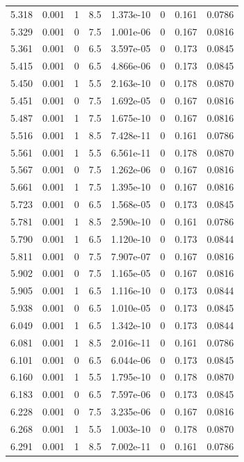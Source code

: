 \documentclass[preview]{standalone}
\begin{document}
{{{{\begin{tabular}{L{1.2cm}C{1.2cm} C{0.3cm}C{0.5cm} C{1.4cm}C{1.4cm} C{1.4cm}C{1.4cm}}
  5.318  &  0.001  & 1     & 8.5 &  1.373e-10  & 0  & 0.161 &  0.0786   \\ 
  5.329  &  0.001  & 0     & 7.5 &  1.001e-06  & 0  & 0.167 &  0.0816   \\ 
  5.361  &  0.001  & 0     & 6.5 &  3.597e-05  & 0  & 0.173 &  0.0845   \\ 
  5.415  &  0.001  & 0     & 6.5 &  4.866e-06  & 0  & 0.173 &  0.0845   \\ 
  5.450  &  0.001  & 1     & 5.5 &  2.163e-10  & 0  & 0.178 &  0.0870   \\ 
  5.451  &  0.001  & 0     & 7.5 &  1.692e-05  & 0  & 0.167 &  0.0816   \\ 
  5.487  &  0.001  & 1     & 7.5 &  1.675e-10  & 0  & 0.167 &  0.0816   \\ 
  5.516  &  0.001  & 1     & 8.5 &  7.428e-11  & 0  & 0.161 &  0.0786   \\ 
  5.561  &  0.001  & 1     & 5.5 &  6.561e-11  & 0  & 0.178 &  0.0870   \\ 
  5.567  &  0.001  & 0     & 7.5 &  1.262e-06  & 0  & 0.167 &  0.0816   \\ 
  5.661  &  0.001  & 1     & 7.5 &  1.395e-10  & 0  & 0.167 &  0.0816   \\ 
  5.723  &  0.001  & 0     & 6.5 &  1.568e-05  & 0  & 0.173 &  0.0845   \\ 
  5.781  &  0.001  & 1     & 8.5 &  2.590e-10  & 0  & 0.161 &  0.0786   \\ 
  5.790  &  0.001  & 1     & 6.5 &  1.120e-10  & 0  & 0.173 &  0.0844   \\ 
  5.811  &  0.001  & 0     & 7.5 &  7.907e-07  & 0  & 0.167 &  0.0816   \\ 
  5.902  &  0.001  & 0     & 7.5 &  1.165e-05  & 0  & 0.167 &  0.0816   \\ 
  5.905  &  0.001  & 1     & 6.5 &  1.116e-10  & 0  & 0.173 &  0.0844   \\ 
  5.938  &  0.001  & 0     & 6.5 &  1.010e-05  & 0  & 0.173 &  0.0845   \\ 
  6.049  &  0.001  & 1     & 6.5 &  1.342e-10  & 0  & 0.173 &  0.0844   \\ 
  6.081  &  0.001  & 1     & 8.5 &  2.016e-11  & 0  & 0.161 &  0.0786   \\ 
  6.101  &  0.001  & 0     & 6.5 &  6.044e-06  & 0  & 0.173 &  0.0845   \\ 
  6.160  &  0.001  & 1     & 5.5 &  1.795e-10  & 0  & 0.178 &  0.0870   \\ 
  6.183  &  0.001  & 0     & 6.5 &  7.597e-06  & 0  & 0.173 &  0.0845   \\ 
  6.228  &  0.001  & 0     & 7.5 &  3.235e-06  & 0  & 0.167 &  0.0816   \\ 
  6.268  &  0.001  & 1     & 5.5 &  1.003e-10  & 0  & 0.178 &  0.0870   \\ 
  6.291  &  0.001  & 1     & 8.5 &  7.002e-11  & 0  & 0.161 &  0.0786   \\ 
\hline 
\end{tabular} 

}}}}
\end{document}

